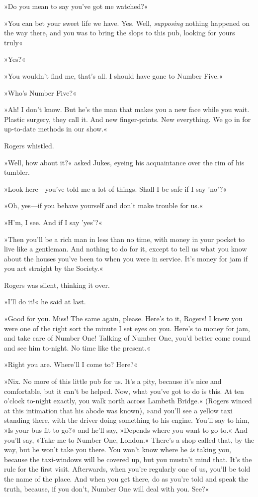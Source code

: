 »Do you mean to say you've got me watched?«

»You can bet your sweet life we have. Yes. Well, \textit{supposing} nothing happened on the way there, and you was to bring the slops to this pub, looking for yours truly\longdash«

»Yes?«

»You wouldn't find me, that's all. I should have gone to Number Five.«

»Who's Number Five?«

»Ah! I don't know. But he's the man that makes you a new face while you wait. Plastic surgery, they call it. And new finger-prints. New everything. We go in for up-to-date methods in our show.«

Rogers whistled.

»Well, how about it?« asked Jukes, eyeing his acquaintance over the rim of his tumbler.

»Look here—you've told me a lot of things. Shall I be safe if I say 'no'?«

»Oh, yes—if you behave yourself and don't make trouble for us.«

»H'm, I see. And if I say 'yes'?«

»Then you'll be a rich man in less than no time, with money in your pocket to live like a gentleman. And nothing to do for it, except to tell us what you know about the houses you've been to when you were in service. It's money for jam if you act straight by the Society.«

Rogers was silent, thinking it over.

»I'll do it!« he said at last.

»Good for you. Miss! The same again, please. Here's to it, Rogers! I knew you were one of the right sort the minute I set eyes on you. Here's to money for jam, and take care of Number One! Talking of Number One, you'd better come round and see him to-night. No time like the present.«

»Right you are. Where'll I come to? Here?«

»Nix. No more of this little pub for us. It's a pity, because it's nice and comfortable, but it can't be helped. Now, what you've got to do is this. At ten o'clock to-night exactly, you walk north across Lambeth Bridge.« (Rogers winced at this intimation that his abode was known), »and you'll see a yellow taxi standing there, with the driver doing something to his engine. You'll say to him, »Is your bus fit to go?« and he'll say, »Depends where you want to go to.« And you'll say, »Take me to Number One, London.« There's a shop called that, by the way, but he won't take you there. You won't know where he \textit{is} taking you, because the taxi-windows will be covered up, but you mustn't mind that. It's the rule for the first visit. Afterwards, when you're regularly one of us, you'll be told the name of the place. And when you get there, do as you're told and speak the truth, because, if you don't, Number One will deal with you. See?«

